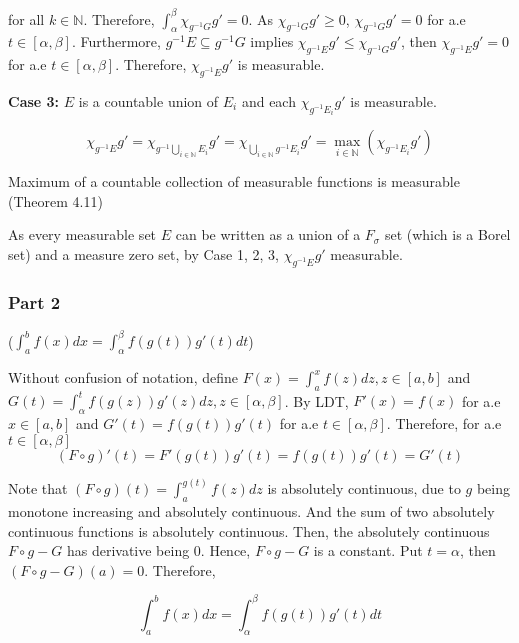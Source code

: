 \documentclass{article}
\newcommand\N{\mathbb{N}}
\begin{document}
for all $k \in \N$. Therefore, $\int_\alpha^\beta \chi_{g^{-1} G} g' = 0$. As $\chi_{g^{-1} G} g' \geq 0$, $\chi_{g^{-1} G} g' = 0$ for a.e $t \in [\alpha, \beta]$. Furthermore, $g^{-1} E \subseteq g^{-1} G$ implies $\chi_{g^{-1} E} g' \leq \chi_{g^{-1} G} g'$, then $\chi_{g^{-1} E} g' = 0$ for a.e $t \in [\alpha, \beta]$. Therefore, $\chi_{g^{-1} E} g'$ is measurable.

\vspace{0.2cm}\textbf{Case 3:} $E$ is a countable union of $E_i$ and each $\chi_{g^{-1} E_i} g'$ is measurable.

\[
    \chi_{g^{-1} E} g' = \chi_{g^{-1} \bigcup_{i \in \N} E_i} g' = \chi_{\bigcup_{i \in \N} g^{-1} E_i} g' = \max_{i \in \N} (\chi_{g^{-1} E_i} g')
\]

Maximum of a countable collection of measurable functions is measurable (Theorem 4.11)


As every measurable set $E$ can be written as a union of a $F_\sigma$ set (which is a Borel set) and a measure zero set, by Case 1, 2, 3, $\chi_{g^{-1} E} g'$ measurable.

\subsubsection{Part 2} ($\int_a^b f(x) dx = \int_\alpha^\beta f(g(t)) g'(t) dt$)

Without confusion of notation, define $F(x) = \int_a^x f(z) dz, z \in [a, b]$
and $G(t) = \int_\alpha^t f(g(z)) g'(z) dz, z \in [\alpha, \beta]$. By LDT, $F'(x) = f(x)$ for a.e $x \in [a, b]$ and $G'(t) = f(g(t)) g'(t)$ for a.e $t \in [\alpha, \beta]$. Therefore, for a.e $t \in [\alpha, \beta]$
\[
    (F \circ g)'(t) = F'(g(t)) g'(t) = f(g(t)) g'(t) = G'(t)
\]

Note that $(F \circ g)(t) = \int_a^{g(t)} f(z) dz$ is absolutely continuous, due to $g$ being monotone increasing and absolutely continuous. And the sum
of two absolutely continuous functions is absolutely continuous. Then, the absolutely continuous $F \circ g - G$ has derivative being $0$. Hence, $F \circ g - G$ is a constant. Put $t = \alpha$, then $(F \circ g - G)(a) = 0$. Therefore,

\[
    \int_a^b f(x) dx = \int_\alpha^\beta f(g(t)) g'(t) dt
\]
\end{document}
